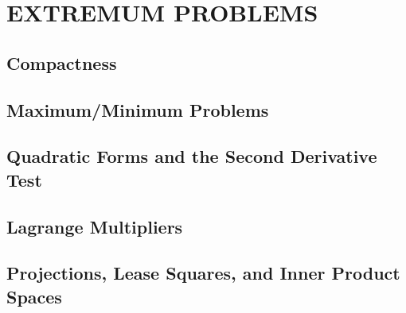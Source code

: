 \section{EXTREMUM PROBLEMS}
\subsection{Compactness}
\subsection{Maximum/Minimum Problems}
\subsection{Quadratic Forms and the Second Derivative Test}
\subsection{Lagrange Multipliers}
\subsection{Projections, Lease Squares, and Inner Product Spaces}